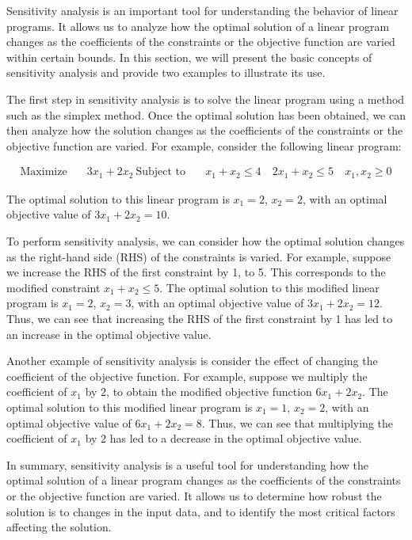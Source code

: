 


Sensitivity analysis is an important tool for understanding the behavior of linear programs. It allows us to analyze how the optimal solution of a linear program changes as the coefficients of the constraints or the objective function are varied within certain bounds. In this section, we will present the basic concepts of sensitivity analysis and provide two examples to illustrate its use.

The first step in sensitivity analysis is to solve the linear program using a method such as the simplex method. Once the optimal solution has been obtained, we can then analyze how the solution changes as the coefficients of the constraints or the objective function are varied. For example, consider the following linear program:

\begin{align*}
\text{Maximize} \quad & 3x_1 + 2x_2 \
\text{Subject to} \quad & x_1 + x_2 \leq 4 \
& 2x_1 + x_2 \leq 5 \
& x_1, x_2 \geq 0
\end{align*}

The optimal solution to this linear program is $x_1 = 2$, $x_2 = 2$, with an optimal objective value of $3x_1 + 2x_2 = 10$.

To perform sensitivity analysis, we can consider how the optimal solution changes as the right-hand side (RHS) of the constraints is varied. For example, suppose we increase the RHS of the first constraint by 1, to 5. This corresponds to the modified constraint $x_1 + x_2 \leq 5$. The optimal solution to this modified linear program is $x_1 = 2$, $x_2 = 3$, with an optimal objective value of $3x_1 + 2x_2 = 12$. Thus, we can see that increasing the RHS of the first constraint by 1 has led to an increase in the optimal objective value.

Another example of sensitivity analysis is consider the effect of changing the coefficient of the objective function. For example, suppose we multiply the coefficient of $x_1$ by 2, to obtain the modified objective function $6x_1 + 2x_2$. The optimal solution to this modified linear program is $x_1 = 1$, $x_2 = 2$, with an optimal objective value of $6x_1 + 2x_2 = 8$. Thus, we can see that multiplying the coefficient of $x_1$ by 2 has led to a decrease in the optimal objective value.

In summary, sensitivity analysis is a useful tool for understanding how the optimal solution of a linear program changes as the coefficients of the constraints or the objective function are varied. It allows us to determine how robust the solution is to changes in the input data, and to identify the most critical factors affecting the solution.